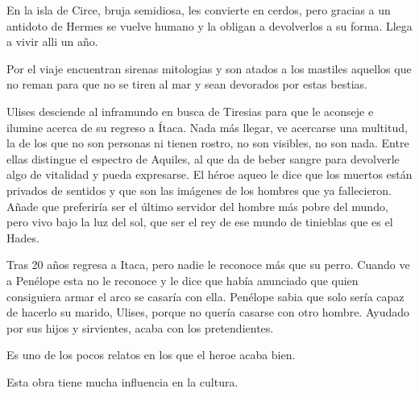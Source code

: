 En la isla de Circe, bruja semidiosa, les convierte en cerdos, pero gracias a un antidoto de Hermes se vuelve humano y la obligan a devolverlos a su forma. Llega a vivir alli un año.

Por el viaje encuentran sirenas mitologias y son atados a los mastiles aquellos que no reman para que no se tiren al mar y sean devorados por estas bestias.

Ulises desciende al inframundo en busca de Tiresias para que le aconseje e ilumine acerca de su regreso a Ítaca. Nada más llegar, ve acercarse una multitud, la de los que no son personas ni tienen rostro, no son visibles, no son nada. Entre ellas distingue el espectro de Aquiles, al que da de beber sangre para devolverle algo de vitalidad y pueda expresarse. El héroe aqueo le dice que los muertos están privados de sentidos y que son las imágenes de los hombres que ya fallecieron. Añade que preferiría ser el último servidor del hombre más pobre del mundo, pero vivo bajo la luz del sol, que ser el rey de ese mundo de tinieblas que es el Hades.

Tras 20 años regresa a Itaca, pero nadie le reconoce más que su perro. Cuando ve a Penélope esta no le reconoce y le dice que había anunciado que quien consiguiera armar el arco se casaría con ella. Penélope sabia que solo sería capaz de hacerlo su marido, Ulises, porque no quería casarse con otro hombre. Ayudado por sus hijos y sirvientes, acaba con los pretendientes.

Es uno de los pocos relatos en los que el heroe acaba bien.

Esta obra tiene mucha influencia en la cultura.